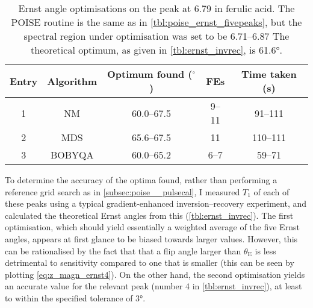 \begin{table}[htb]
    \centering
    \begin{tabular}{ccccc}
        \toprule
        Entry & Algorithm & Optimum found ($^\circ$) & FEs   & Time taken (\si{\s}) \\
        \midrule
        1     & NM        & 60.0--67.5               & 9--11 & 91--111              \\
        2     & MDS       & 65.6--67.5               & 11    & 110--111             \\
        3     & BOBYQA    & 60.0--65.2               & 6--7  & 59--71               \\
        \bottomrule
    \end{tabular}
    \caption[Ernst angle optimisations on only one peak]{
        Ernst angle optimisations on the peak at \SI{6.79}{\ppm} in ferulic acid.
        The POISE routine is the same as in \cref{tbl:poise_ernst_fivepeaks}, but the spectral region under optimisation was set to be 6.71--\SI{6.87}{\ppm}
        The theoretical optimum, as given in \cref{tbl:ernst_invrec}, is \ang{61.6}.
    }
    \label{tbl:poise_ernst_onepeak}
\end{table}

To determine the accuracy of the optima found, rather than performing a reference grid search as in \cref{subsec:poise__pulsecal}, I measured $T_1$ of each of these peaks using a typical gradient-enhanced inversion--recovery experiment, and calculated the theoretical Ernst angles from this (\cref{tbl:ernst_invrec}).
The first optimisation, which should yield essentially a weighted average of the five Ernst angles, appears at first glance to be biased towards larger values.
However, this can be rationalised by the fact that that a flip angle larger than $\theta_\text{E}$ is less detrimental to sensitivity compared to one that is smaller (this can be seen by plotting \cref{eq:z_magn_ernst4}).
On the other hand, the second optimisation yields an accurate value for the relevant peak (number 4 in \cref{tbl:ernst_invrec}), at least to within the specified tolerance of \ang{3}.

